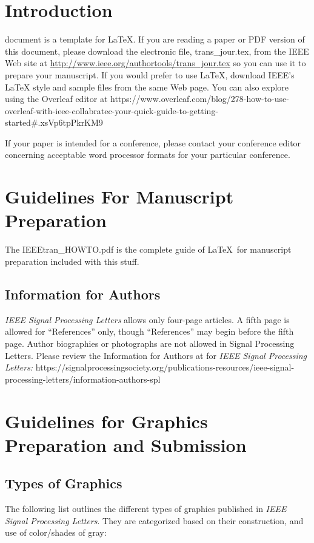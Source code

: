
\section{Introduction}

 document is a template for \LaTeX. If you are reading a paper or PDF version of this document, please download the electronic file, trans\_jour.tex, from the IEEE Web site at \url{http://www.ieee.org/authortools/trans_jour.tex} so you can use it to prepare your manuscript. If you would prefer to use LaTeX, download IEEE's LaTeX style and sample files from the same Web page. You can also explore using the Overleaf editor at {https://www.overleaf.com/blog/278-how-to-use-overleaf-with-ieee-collabratec-your-quick-guide-to-getting-started\#.xsVp6tpPkrKM9}

If your paper is intended for a conference, please contact your conference editor concerning acceptable word processor formats for your particular conference.  


\section{Guidelines For Manuscript Preparation}


The IEEEtran\_HOWTO.pdf is the complete guide of \LaTeX\ for manuscript preparation included with this stuff. 


\subsection{Information for Authors}

{\em IEEE Signal Processing Letters} allows only four-page articles. A fifth page is allowed for ``References'' only, though ``References'' may begin before the fifth page. Author biographies or photographs are not allowed in Signal Processing Letters. Please review the Information for Authors at for {\em IEEE Signal Processing Letters:} https://signalprocessingsociety.org/publications-resources/ieee-signal-processing-letters/information-authors-spl



\section{Guidelines for Graphics Preparation and Submission}
\label{sec:guidelines}

\subsection{Types of Graphics}
The following list outlines the different types of graphics published in 
{\it IEEE Signal Processing Letters}. They are categorized based on their construction, and use of 
color/shades of gray:

